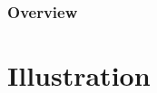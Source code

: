 \documentclass[mathserif,t]{beamer}
\begin{document}
\begin{frame}
\frametitle{Overview} %
\tableofcontents %
\end{frame}

\section{Illustration}
\end{document}
